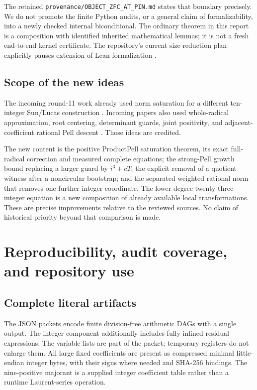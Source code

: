 \documentclass[11pt,a4paper]{article}
\newcommand{\file}[1]{\nolinkurl{#1}}
\theoremstyle{definition}
\theoremstyle{remark}
\numberwithin{equation}{section}
\begin{document}
The retained \file{provenance/OBJECT_ZFC_AT_PIN.md} states that boundary
precisely. We do not promote the finite Python audits, or a general claim
of formalizability, into a newly checked internal biconditional. The
ordinary theorem in this report is a composition with identified
inherited mathematical lemmas; it is not a fresh end-to-end kernel
certificate. The repository's current size-reduction plan explicitly
pauses extension of Lean formalization \cite{repo}.

\subsection{Scope of the new ideas}

The incoming round-11 work already used norm saturation for a different
ten-integer Sun/Lucas construction \cite{round11}. Incoming papers also
used whole-radical approximation, root centering, determinant guards,
joint positivity, and adjacent-coefficient rational Pell descent
\cite{radical,budget,joint}. Those ideas are credited.

The new content is the positive ProductPell saturation theorem, its
exact full-radical correction and measured complete equations; the
strong-Pell growth bound replacing a larger guard by \(i^3+cT\);
the explicit removal of a quotient witness after a noncircular bootstrap;
and the separated weighted rational norm that removes one further
integer coordinate. The lower-degree twenty-three-integer equation
is a new composition of already available local transformations.
These are precise improvements relative to the reviewed sources.
No claim of historical priority beyond that comparison is made.





\section{Reproducibility, audit coverage, and repository use}
\label{sec:reproduction}

\subsection{Complete literal artifacts}

The JSON packets encode finite division-free arithmetic DAGs with a
single output. The integer component additionally includes fully
inlined residual expressions. The variable lists are part of the packet;
temporary registers do not enlarge them. All large fixed coefficients
are present as compressed minimal little-endian integer bytes, with
their signs where needed and SHA-256 bindings. The nine-positive
majorant is a supplied integer coefficient table rather than a runtime
Laurent-series operation.
\end{document}
